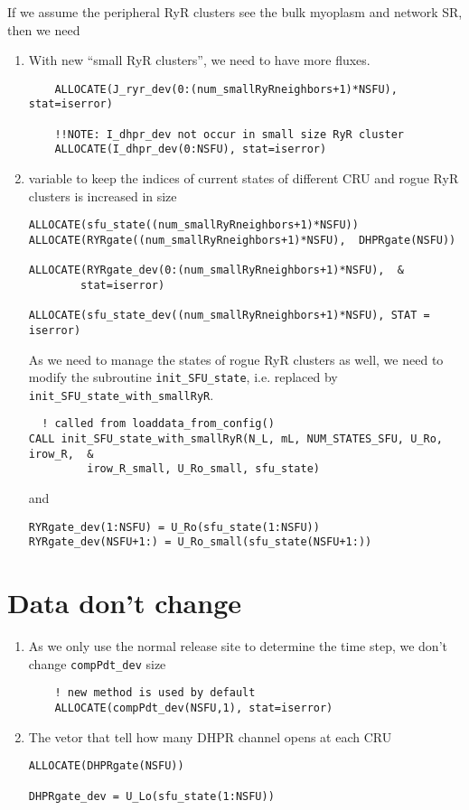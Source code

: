 If we assume the peripheral RyR clusters see the bulk myoplasm and network SR,
then we need
\begin{enumerate}
  \item With new ``small RyR clusters'', we need to have more fluxes.
\begin{verbatim}
    ALLOCATE(J_ryr_dev(0:(num_smallRyRneighbors+1)*NSFU), stat=iserror)
    
    !!NOTE: I_dhpr_dev not occur in small size RyR cluster
    ALLOCATE(I_dhpr_dev(0:NSFU), stat=iserror)
\end{verbatim}

  \item variable to keep the indices of current states of different CRU
  and rogue RyR clusters is increased in size
  \begin{verbatim}
ALLOCATE(sfu_state((num_smallRyRneighbors+1)*NSFU))
ALLOCATE(RYRgate((num_smallRyRneighbors+1)*NSFU),  DHPRgate(NSFU))

ALLOCATE(RYRgate_dev(0:(num_smallRyRneighbors+1)*NSFU),  &
        stat=iserror)
    
ALLOCATE(sfu_state_dev((num_smallRyRneighbors+1)*NSFU), STAT = iserror)
  \end{verbatim}
  
As we need to manage the states of rogue RyR clusters as well, we need to
modify the subroutine \verb!init_SFU_state!, i.e. replaced by
\verb!init_SFU_state_with_smallRyR!. 

  \begin{verbatim}
  ! called from loaddata_from_config()
CALL init_SFU_state_with_smallRyR(N_L, mL, NUM_STATES_SFU, U_Ro, irow_R,  &
         irow_R_small, U_Ro_small, sfu_state)
  \end{verbatim}
and
\begin{verbatim}
RYRgate_dev(1:NSFU) = U_Ro(sfu_state(1:NSFU))
RYRgate_dev(NSFU+1:) = U_Ro_small(sfu_state(NSFU+1:))
\end{verbatim}
\end{enumerate}

\section{Data don't change}

\begin{enumerate}
  \item As we only use the normal release site to determine the time step, we
  don't change \verb!compPdt_dev! size
\begin{verbatim}
	! new method is used by default
    ALLOCATE(compPdt_dev(NSFU,1), stat=iserror)  
\end{verbatim}  

\item The vetor that tell how many DHPR channel opens at each CRU
\begin{verbatim}
ALLOCATE(DHPRgate(NSFU))

DHPRgate_dev = U_Lo(sfu_state(1:NSFU))

\end{verbatim}

\end{enumerate}

